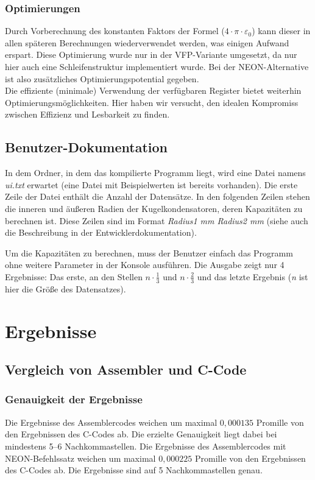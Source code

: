 \documentclass[11pt]{scrartcl}
\begin{document}
\subsubsection{Optimierungen}
Durch Vorberechnung des konstanten Faktors der Formel ($4 \cdot \pi \cdot \varepsilon_{0}$) kann dieser in allen späteren Berechnungen wiederverwendet werden, was einigen Aufwand erspart. Diese Optimierung wurde nur in der VFP-Variante umgesetzt, da nur hier auch eine Schleifenstruktur implementiert wurde. Bei der NEON-Alternative ist also zusätzliches Optimierungspotential gegeben.\\
Die effiziente (minimale) Verwendung der verfügbaren Register bietet weiterhin Optimierungsmöglichkeiten. Hier haben wir versucht, den idealen Kompromiss zwischen Effizienz und Lesbarkeit zu finden.

\subsection{Benutzer-Dokumentation}
In dem Ordner, in dem das kompilierte Programm liegt, wird eine Datei namens \emph{ui.txt} erwartet (eine Datei mit Beispielwerten ist bereits vorhanden). Die erste Zeile der Datei enthält die Anzahl der Datensätze. In den folgenden Zeilen stehen die inneren und äußeren Radien der Kugelkondensatoren, deren Kapazitäten zu berechnen ist. Diese Zeilen sind im Format \emph{Radius1 mm Radius2 mm} (siehe auch die Beschreibung in der Entwicklerdokumentation).

Um die Kapazitäten zu berechnen, muss der Benutzer einfach das Programm ohne weitere Parameter in der Konsole ausführen. Die Ausgabe zeigt nur 4 Ergebnisse: Das erste, an den Stellen 
$n \cdot \frac{1}{3}$ und
$n \cdot \frac{2}{3}$
und das letzte Ergebnis (\emph{n} ist hier die Größe des Datensatzes).
\section{Ergebnisse}
\subsection{Vergleich von Assembler und C-Code}
\subsubsection{Genauigkeit der Ergebnisse}
Die Ergebnisse des Assemblercodes weichen um maximal $0,000135$ Promille von den Ergebnissen des C-Codes ab. Die erzielte Genauigkeit liegt dabei bei mindestens 5--6 Nachkommastellen. Die  Ergebnisse des Assemblercodes mit NEON-Befehlssatz weichen um maximal $0,000225$ Promille von den Ergebnissen des C-Codes ab. Die Ergebnisse sind auf 5 Nachkommastellen genau.
\end{document}
